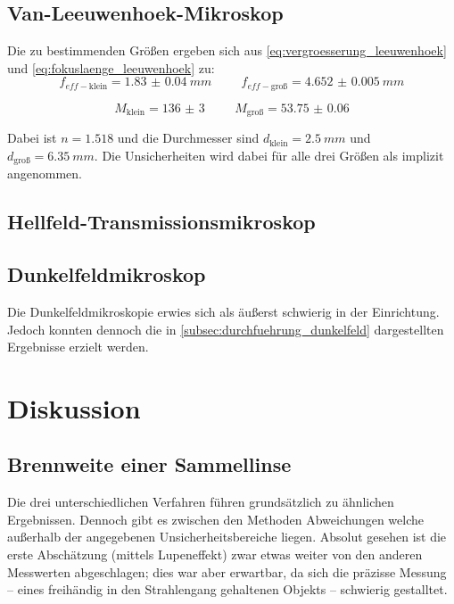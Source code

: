 \documentclass[ngerman]{scrartcl}
\begin{document}
\subsection{Van-Leeuwenhoek-Mikroskop}
\label{subsec:auswertung_Leeuwenhoek}

Die zu bestimmenden Größen ergeben sich aus \autoref{eq:vergroesserung_leeuwenhoek} und \autoref{eq:fokuslaenge_leeuwenhoek} zu:
\[f_{eff-\text{klein}} = \SI{1.83(4)}{mm} \hspace{1cm} f_{eff-\text{groß}} = \SI{4.652(5)}{mm}\]

\[M_\text{klein} = \num{136(3)} \hspace{1cm} M_\text{groß} = \num{53.75(6)}\]

Dabei ist $n = \num{1.518}$ und die Durchmesser sind $d_\text{klein} = \SI{2.5}{mm}$ und $d_\text{groß} = \SI{6.35}{mm}$. Die Unsicherheiten wird dabei für alle drei Größen als implizit angenommen.


\subsection{Hellfeld-Transmissionsmikroskop}
\label{subsec:auswertung_hellfeld}


\subsection{Dunkelfeldmikroskop}
\label{subsec:auswertung_dunkelfeldmikroskop}

Die Dunkelfeldmikroskopie erwies sich als äußerst schwierig in der Einrichtung. Jedoch konnten dennoch die in \autoref{subsec:durchfuehrung_dunkelfeld} dargestellten Ergebnisse erzielt werden.



\section{Diskussion}
\label{sec:diskussion}

\subsection{Brennweite einer Sammellinse}
\label{subsec:diskussion_sammellinse}

Die drei unterschiedlichen Verfahren führen grundsätzlich zu ähnlichen Ergebnissen. Dennoch gibt es zwischen den Methoden Abweichungen welche außerhalb der angegebenen Unsicherheitsbereiche liegen. Absolut gesehen ist die erste Abschätzung (mittels Lupeneffekt) zwar etwas weiter von den anderen Messwerten abgeschlagen; dies war aber erwartbar, da sich die präzisse Messung -- eines freihändig in den Strahlengang gehaltenen Objekts -- schwierig gestalltet.
\end{document}
